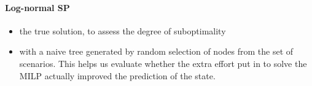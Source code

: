 \paragraph{Log-normal SP}

\begin{itemize}
\item the true solution, to assess the degree of suboptimality
\item with a naive tree generated by random selection of nodes from the set of scenarios. This helps us evaluate whether the extra effort put in to solve the MILP actually improved the prediction of the state.
\end{itemize}
